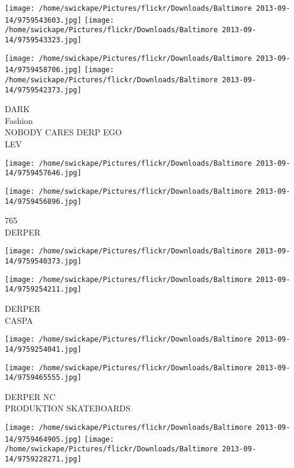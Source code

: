 \documentclass[10pt,letterpaper]{article}
\begin{document}
\texttt{[image: /home/swickape/Pictures/flickr/Downloads/Baltimore 2013-09-14/9759543603.jpg]}
\texttt{[image: /home/swickape/Pictures/flickr/Downloads/Baltimore 2013-09-14/9759543323.jpg]}

\texttt{[image: /home/swickape/Pictures/flickr/Downloads/Baltimore 2013-09-14/9759458706.jpg]}
\texttt{[image: /home/swickape/Pictures/flickr/Downloads/Baltimore 2013-09-14/9759542373.jpg]}

DARK\\
Fashion\\
NOBODY CARES DERP EGO\\
LEV\\
\pagebreak

\texttt{[image: /home/swickape/Pictures/flickr/Downloads/Baltimore 2013-09-14/9759457646.jpg]}

\vspace{0.25in}
\texttt{[image: /home/swickape/Pictures/flickr/Downloads/Baltimore 2013-09-14/9759456896.jpg]}

765\\
DERPER\\
\pagebreak

\texttt{[image: /home/swickape/Pictures/flickr/Downloads/Baltimore 2013-09-14/9759540373.jpg]}

\vspace{0.25in}
\texttt{[image: /home/swickape/Pictures/flickr/Downloads/Baltimore 2013-09-14/9759254211.jpg]}

DERPER\\
CASPA\\
\pagebreak

\texttt{[image: /home/swickape/Pictures/flickr/Downloads/Baltimore 2013-09-14/9759254041.jpg]}

\vspace{0.25in}
\texttt{[image: /home/swickape/Pictures/flickr/Downloads/Baltimore 2013-09-14/9759465555.jpg]}

DERPER NC\\
PRODUKTION SKATEBOARDS\\
\pagebreak

\texttt{[image: /home/swickape/Pictures/flickr/Downloads/Baltimore 2013-09-14/9759464905.jpg]}
\texttt{[image: /home/swickape/Pictures/flickr/Downloads/Baltimore 2013-09-14/9759228271.jpg]}
\end{document}
